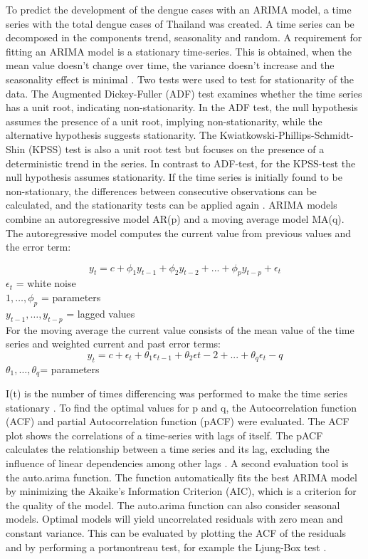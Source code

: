 To predict the development of the dengue cases with an ARIMA model, a time series with the total dengue cases of Thailand was created. A time series can be decomposed in the components trend, seasonality and random. 
A requirement for fitting an ARIMA model is a stationary time-series. This is obtained, when the mean value doesn’t change over time, the variance doesn’t increase and the seasonality effect is minimal \citep{Prabhakaran2017}. Two tests were used to test for stationarity of the data. The Augmented Dickey-Fuller (ADF) test examines whether the time series has a unit root, indicating non-stationarity. In the ADF test, the null hypothesis assumes the presence of a unit root, implying non-stationarity, while the alternative hypothesis suggests stationarity. The Kwiatkowski-Phillips-Schmidt-Shin (KPSS) test is also a unit root test but focuses on the presence of a deterministic trend in the series. In contrast to ADF-test, for the KPSS-test the null hypothesis assumes stationarity. If the time series is initially found to be non-stationary, the differences between consecutive observations can be calculated, and the stationarity tests can be applied again \citep{Hyndman2018}.
ARIMA models combine an autoregressive model AR(p) and a moving average model MA(q). 
The autoregressive model computes the current value from previous values and the error term:

	\[y_t = c + \phi_1 y_{t-1} + \phi_2 y_{t-2}+...+ \phi_p y_{t-p}+ \epsilon _t\]
	$\epsilon _t$ = white noise\\
	$1,…,\phi _p$ = parameters\\
	$y_{t-1},…, y_{t-p}$ = lagged values \\
	
	For the moving average the current value consists of the mean value of the time series and weighted current and past error terms: 
	\[y_t=c+\epsilon _t+\theta_1 \epsilon _{t-1}+\theta_2 \epsilon t-2+...+\theta_q \epsilon _t-q\]
	$\theta_1,…, \theta _q $= parameters
	
I(t) is the number of times differencing was performed to make the time series stationary \citep{Venkat2018}.
To find the optimal values for p and q, the Autocorrelation function (ACF) and partial Autocorrelation function (pACF) were evaluated. The ACF plot shows the correlations of a time-series with lags of itself.  The pACF calculates the relationship between a time series and its lag, excluding the influence of linear dependencies among other lags \citep{Prabhakaran2017}.
A second evaluation tool is the auto.arima function. The function automatically fits the best ARIMA model by minimizing the Akaike’s Information Criterion (AIC), which is a criterion for the quality of the model. The auto.arima function can also consider seasonal models. 
Optimal models will yield uncorrelated residuals with zero mean and constant variance. This can be evaluated by plotting the ACF of the residuals and by performing a portmontreau test, for example the Ljung-Box test \citep{Hyndman2018}.


